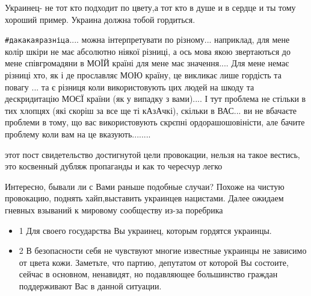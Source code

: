 \begin{itemize}
Украинец- не тот кто подходит по цвету,а тот кто в душе и в сердце и ты тому
хороший пример. Украина должна тобой гордиться.


 

\verb|#дакакаяразніца|.... можна інтерпретувати по різному... наприклад, для мене
колір шкіри не має абсолютно ніякої різниці, а ось мова якою звертаються до
мене співгромадяни в МОЇЙ країні для мене має значення.... Для мене немає різниці
хто, як і де прославляє МОЮ країну, це викликає лише гордість та повагу ... та є
різниця коли використовують цих людей на шкоду та дескридитацію МОЄЇ країни (як
у випадку з вами).... І тут проблема не стільки в тих хлопцях (які скоріш за все
ще ті кАзАчкі), скільки в ВАС... ви не вбачаєте проблеми в тому, що вас
використовують скрєпні ордорашошовіністи, але бачите проблему коли вам на це
вказують........


 

этот пост свидетельство достигнутой цели провокации, нельзя на такое вестись,
это косвенный дубляж пропаганды и как то чересчур легко

 

Интересно, бывали ли с Вами раньше подобные случаи? Похоже на чистую
провокацию, поднять хайп,выставить украинцев нацистами. Далее ожидаем гневных
взываний к мировому сообществу из-за поребрика

\begin{itemize}
\item 1 Для своего государства Вы украинец, которым гордятся украинцы.

\item 2 В безопасности себя не чувствуют многие известные украинцы не зависимо от
цвета кожи. Заметьте, что партию, депутатом от которой Вы состоите, сейчас в
основном, ненавидят, но подавляющее большинство граждан поддерживают Вас в
данной ситуации.


\end{itemize}
\end{itemize}
